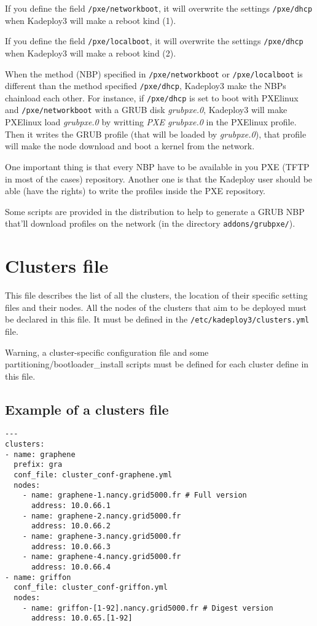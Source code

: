 \documentclass[a4wide,10pt,oneside]{book}
\newcommand{\ypath}[1]{\texttt{#1}}
\begin{document}
If you define the field \ypath{/pxe/networkboot}, it will overwrite the settings \ypath{/pxe/dhcp} when Kadeploy3 will make a reboot kind (1).

If you define the field \ypath{/pxe/localboot}, it will overwrite the settings \ypath{/pxe/dhcp} when Kadeploy3 will make a reboot kind (2).

When the method (NBP) specified in \ypath{/pxe/networkboot} or \ypath{/pxe/localboot} is different than the method specified \ypath{/pxe/dhcp}, Kadeploy3 make the NBPs chainload each other. For instance, if \ypath{/pxe/dhcp} is set to boot with PXElinux and \ypath{/pxe/networkboot} with a GRUB disk \emph{grubpxe.0}, Kadeploy3 will make PXElinux load \emph{grubpxe.0} by writting \emph{PXE grubpxe.0} in the PXElinux profile. Then it writes the GRUB profile (that will be loaded by \emph{grubpxe.0}), that profile will make the node download and boot a kernel from the network.

One important thing is that every NBP have to be available in you PXE (TFTP in most of the cases) repository. Another one is that the Kadeploy user should be able (have the rights) to write the profiles inside the PXE repository.

Some scripts are provided in the distribution to help to generate a GRUB NBP that'll download profiles on the network (in the directory \texttt{addons/grubpxe/}).


\section{Clusters file\label{sec:clusters_conf}}
This file describes the list of all the clusters, the location of their specific setting files and their nodes. All the nodes of the clusters that aim to be deployed must be declared in this file. It must be defined in the  \texttt{/etc/kadeploy3/clusters.yml} file.

Warning, a cluster-specific configuration file and some partitioning/bootloader\_install scripts must be defined for each cluster define in this file.

\subsection{Example of a clusters file\\}
\begin{small}
\begin{verbatim}
--- 
clusters:
- name: graphene
  prefix: gra
  conf_file: cluster_conf-graphene.yml
  nodes: 
    - name: graphene-1.nancy.grid5000.fr # Full version
      address: 10.0.66.1
    - name: graphene-2.nancy.grid5000.fr
      address: 10.0.66.2
    - name: graphene-3.nancy.grid5000.fr
      address: 10.0.66.3
    - name: graphene-4.nancy.grid5000.fr
      address: 10.0.66.4
- name: griffon
  conf_file: cluster_conf-griffon.yml
  nodes: 
    - name: griffon-[1-92].nancy.grid5000.fr # Digest version
      address: 10.0.65.[1-92]
\end{verbatim}
\end{small}
\end{document}
